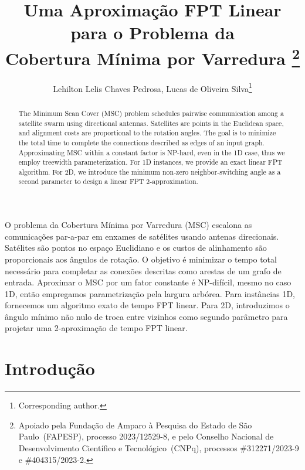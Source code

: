 \documentclass[12pt]{article}
\title{
    Uma Aproximação FPT Linear para o Problema da\\
    Cobertura Mínima por Varredura%
    \thanks{
        Apoiado pela Fundação de Amparo à Pesquisa do Estado de São Paulo~(FAPESP), processo
        \mbox{2023/12529-8},
        e pelo Conselho Nacional de Desenvolvimento Científico e Tecnológico~(CNPq), processos
        \mbox{\#312271/2023-9} e %
        \mbox{\#404315/2023-2}.  %
    }
}
\author{Lehilton Lelis Chaves Pedrosa\inst{1},
    Lucas de Oliveira Silva\inst{1}\thanks{Corresponding author.}}
\begin{document}
\maketitle

\begin{abstract}
    The Minimum Scan Cover (MSC) problem schedules pairwise communication among a satellite swarm using directional antennas. Satellites are points in the Euclidean space, and alignment costs are proportional to the rotation angles.
    The goal is to minimize the total time to complete the connections described as edges of an input graph.
    Approximating MSC within a constant factor is \mbox{NP-hard}, even in the 1D case, thus we employ treewidth parameterization.
    For 1D instances, we provide an exact linear FPT algorithm.
    For 2D, we introduce the minimum non-zero neighbor-switching angle as a second parameter to design a linear FPT 2-approximation.
\end{abstract}

\begin{resumo}
    O problema da Cobertura Mínima por Varredura (MSC) escalona as comunicações par-a-par em enxames de satélites usando antenas direcionais. Satélites são pontos no espaço Euclidiano e os custos de alinhamento são proporcionais aos ângulos de rotação.
    O objetivo é minimizar o tempo total necessário para completar as conexões descritas como arestas de um grafo de entrada.
    Aproximar o MSC por um fator constante é NP-difícil, mesmo no caso 1D, então empregamos parametrização pela largura arbórea.
    Para instâncias 1D, fornecemos um algoritmo exato de tempo FPT linear.
    Para 2D, introduzimos o ângulo mínimo não nulo de troca entre vizinhos como segundo parâmetro para projetar uma 2-aproximação de tempo FPT linear.
\end{resumo}

\section{Introdução}
\end{document}
